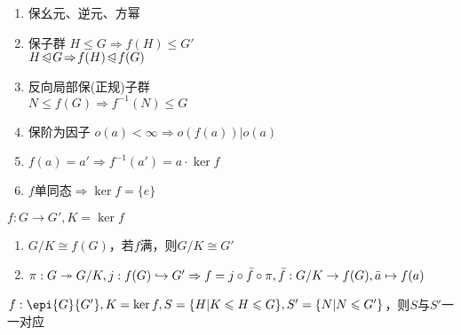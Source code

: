\documentclass[b4paper, 10pt]{ctexart}
\newcommand*{\impl}{\Rightarrow}
\renewcommand*{\leq}{\leqslant}
\newcommand*{\nmsubgroupeq}{\trianglelefteqslant}
\begin{document}
\begin{multicols}{3}
\begin{theorem}[同态性质]
        \begin{enumerate}
            \item 保幺元、逆元、方幂
            \item 保子群 $H \leq G \impl f(H) \leq G'$\\
                  $H \!\nmsubgroupeq\! G \!\impl\! f(H) \!\nmsubgroupeq\! f(G)$
            \item 反向局部保(正规)子群 \\
                  $N \!\leq\! f(G) \!\impl\! f^{-1}(N) \!\leq\! G$
            \item 保阶为因子 $o(a) \!<\! \infty \!\impl\! o(f(a)) | o(a)$
            \item $f(a) = a' \impl f^{-1}(a') = a \cdot \ker f$
            \item $f$单同态$\impl \ker f = \{e\}$
        \end{enumerate}
    \end{theorem}

    \begin{theorem}[同态基本定理]
        $f: G \rightarrow G', K = \ker f$

        \begin{enumerate}
            \item $G/K \cong f(G)$，若$f$满，则$G/K \cong G'$
            \item $\pi: G \twoheadrightarrow G/K, j: f(G) \hookrightarrow G' \impl \\
                      f = j \circ \bar{f} \circ \pi, \bar{f}: G/K \rightarrow f(G), \bar{a} \mapsto f(a)$
        \end{enumerate}

    \end{theorem}

    \begin{theorem}[子群对应定理]
        $f: \epi{G}{G'}, K = \ker f, S = \{ H | K \leq H \leq G \}, S' = \{ N | N \leq G' \}$，则$S$与$S'$一一对应
    \end{theorem}


\end{multicols}
\end{document}
